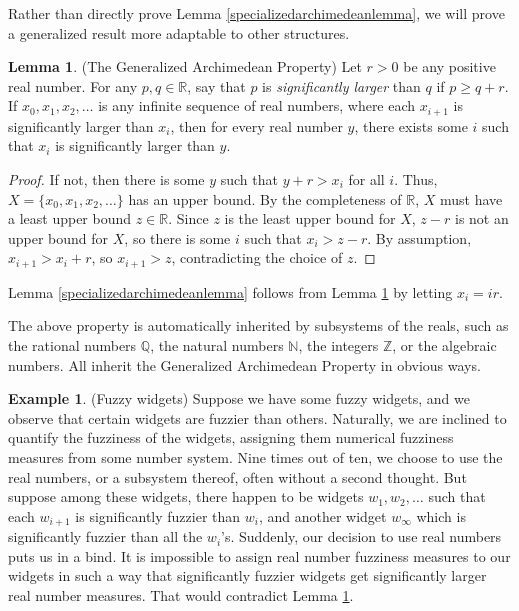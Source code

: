 \documentclass[reqno]{article}
\theoremstyle{definition}
\newtheorem{lemma}[theorem]{Lemma}
\newtheorem{example}[theorem]{Example}
\begin{document}
Rather than directly prove Lemma \ref{specializedarchimedeanlemma},
we will prove a generalized result more adaptable
to other structures.

\begin{lemma}
\label{generalizedarchimedeanlemma}
(The Generalized Archimedean Property)
Let $r>0$ be any positive real number.
For any $p,q\in\mathbb R$, say that $p$ is \emph{significantly larger}
than $q$ if $p\geq q+r$.
If $x_0,x_1,x_2,\ldots$ is any infinite sequence of real numbers,
where each $x_{i+1}$ is significantly larger than $x_i$, then for every real number $y$,
there exists some $i$ such that $x_i$ is significantly larger than $y$.
\end{lemma}

\begin{proof}
If not, then there is some $y$ such that $y+r > x_i$ for all $i$.
Thus, $X=\{x_0,x_1,x_2,\ldots\}$ has an upper bound. By the completeness
of $\mathbb R$, $X$ must have a least upper bound $z\in\mathbb R$.
Since $z$ is the least upper bound for $X$, $z-r$ is not an upper bound
for $X$, so there is some $i$ such that $x_i>z-r$.
By assumption, $x_{i+1}>x_i+r$, so $x_{i+1}>z$, contradicting the choice
of $z$.
\end{proof}

Lemma \ref{specializedarchimedeanlemma} follows from
Lemma \ref{generalizedarchimedeanlemma} by letting $x_i=ir$.

The above property is automatically inherited by subsystems
of the reals, such as the rational numbers $\mathbb Q$, the natural
numbers $\mathbb N$, the integers $\mathbb Z$, or the algebraic numbers.
All inherit the Generalized Archimedean Property in obvious ways.

\begin{example}
\label{fuzzywidgets}
(Fuzzy widgets)
Suppose we have some fuzzy widgets, and we observe that certain
widgets are fuzzier than others. Naturally, we are inclined to
quantify the fuzziness of the widgets, assigning them numerical
fuzziness measures from some number system. Nine times out of ten,
we choose to use the real numbers, or a subsystem thereof,
often without a second thought. But suppose
among these widgets, there happen to be widgets $w_1,w_2,\ldots$
such that each $w_{i+1}$ is significantly fuzzier than $w_i$,
and another widget $w_\infty$ which is significantly fuzzier than all the $w_i$'s.
Suddenly, our decision to use real numbers puts us in a bind.
It is impossible to assign real number fuzziness measures to our
widgets in such a way that significantly fuzzier widgets get
significantly larger real number measures. That would
contradict Lemma \ref{generalizedarchimedeanlemma}.
\end{example}
\end{document}
